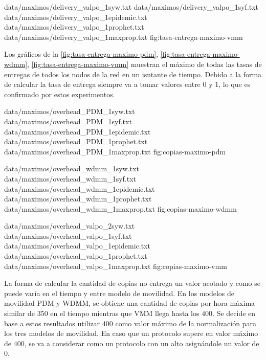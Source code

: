 {
{data/maximos/delivery_valpo_1syw.txt}
{data/maximos/delivery_valpo_1syf.txt}
{data/maximos/delivery_valpo_1epidemic.txt}
{data/maximos/delivery_valpo_1prophet.txt}
{data/maximos/delivery_valpo_1maxprop.txt}
}{fig:tasa-entrega-maximo-vmm}

Los gráficos de la \ref{fig:tasa-entrega-maximo-pdm},
\ref{fig:tasa-entrega-maximo-wdmm}, \ref{fig:tasa-entrega-maximo-vmm} muestran
el máximo de todas las tasas de entregas de todos los nodos de la red en un
isntante de tiempo. Debido a la forma de calcular la tasa de entrega siempre va
a tomar valores entre $0$ y $1$, lo que es confirmado por estos experimentos.


{
{data/maximos/overhead_PDM_1syw.txt}
{data/maximos/overhead_PDM_1syf.txt}
{data/maximos/overhead_PDM_1epidemic.txt}
{data/maximos/overhead_PDM_1prophet.txt}
{data/maximos/overhead_PDM_1maxprop.txt}
}{fig:copias-maximo-pdm}


{
{data/maximos/overhead_wdmm_1syw.txt}
{data/maximos/overhead_wdmm_1syf.txt}
{data/maximos/overhead_wdmm_1epidemic.txt}
{data/maximos/overhead_wdmm_1prophet.txt}
{data/maximos/overhead_wdmm_1maxprop.txt}
}{fig:copias-maximo-wdmm}



{
{data/maximos/overhead_valpo_2syw.txt}
{data/maximos/overhead_valpo_1syf.txt}
{data/maximos/overhead_valpo_1epidemic.txt}
{data/maximos/overhead_valpo_1prophet.txt}
{data/maximos/overhead_valpo_1maxprop.txt}
}{fig:copias-maximo-vmm}

La forma de calcular la cantidad de copias no entrega un valor acotado y como se
puede varía en el tiempo y entre modelo de movilidad. En los modelos de
movilidad PDM y WDMM, se obtiene una cantidad de copias por hora máxima similar
de $350$ en el tiempo mientras que VMM llega hasta los $400$.  Se decide en base
a estos resultados utilizar $400$ como valor máximo de la normalización para los
tres modelos de movilidad. En caso que un protocolo supere en valor máximo de
$400$, se va a considerar como un protocolo con un alto \overhead{} asignándole
un valor de $0$.

